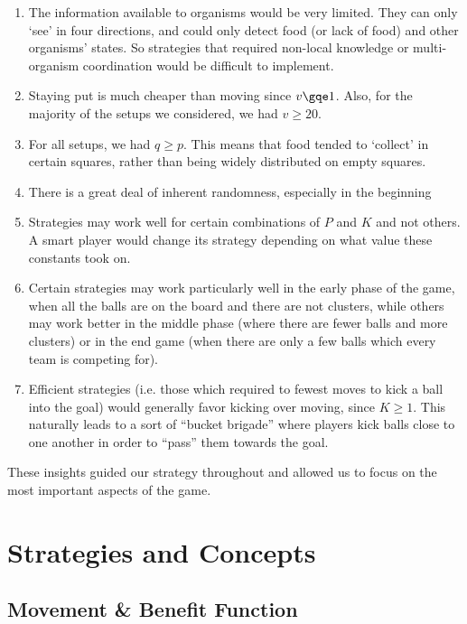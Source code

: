 \documentclass[
10pt, %
letterpaper, %
oneside, %
headinclude,footinclude, %
english
]{article}
\begin{document}
\begin{enumerate}
  \item The information available to organisms would be very limited. They can only `see' in four directions, and could only detect food (or lack of food) and other organisms' states. So strategies that required non-local knowledge or multi-organism coordination would be difficult to implement.
  \item Staying put is much cheaper than moving since $v \gqe 1$. Also, for the majority of the setups we considered, we had $v \geq 20$.
  \item For all setups, we had $q \geq p$. This means that food tended to `collect' in certain squares, rather than being widely distributed on empty squares.
  \item There is a great deal of inherent randomness, especially in the beginning
  \item Strategies may work well for certain combinations of $P$ and $K$ and not others. A smart player would change its strategy depending on what value these constants took on.
  \item Certain strategies may work particularly well in the early phase of the game, when all the balls are on the board and there are not clusters, while others may work better in the middle phase (where there are fewer balls and more clusters) or in the end game (when there are only a few balls which every team is competing for).
  \item Efficient strategies (i.e. those which required to fewest moves to kick a ball into the goal) would generally favor kicking over moving, since $K \geq 1$. This naturally leads to a sort of ``bucket brigade'' where players kick balls close to one another in order to ``pass'' them towards the goal.
\end{enumerate}

These insights guided our strategy throughout and allowed us to focus on the most important aspects of the game.

\section{Strategies and Concepts}

\subsection {Movement \& Benefit Function}
\end{document}
